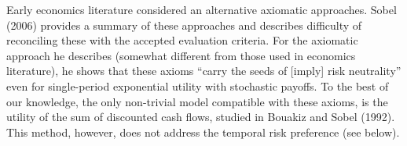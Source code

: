\documentclass[mnsc,nonblindrev,copyedit]{informs2_wz} %
\begin{document}
Early economics literature considered an alternative axiomatic approaches.  Sobel (2006) provides a summary of these approaches and describes difficulty of reconciling these with the accepted evaluation criteria.   For the axiomatic approach he describes (somewhat different from those used in economics literature), he shows that these axioms ``carry the seeds of [imply] risk neutrality'' even for single-period exponential utility with stochastic payoffs.    To the best of our knowledge, the only non-trivial model compatible with these axioms, is the utility of the sum of discounted cash flows, studied in Bouakiz and Sobel (1992). This method, however, does not address the temporal risk preference (see below).  %
\end{document}
